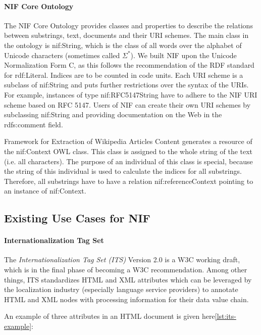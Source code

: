\documentclass[thesis=M,english,hidelinks]{FITthesis}[2019/12/23]
\begin{document}
\paragraph{NIF Core Ontology}



The NIF Core Ontology\cite{nif_core_ontology} provides classes and properties to describe the relations between substrings, text, documents and their URI schemes. The main class in the ontology is nif:String, which is the class of all words over the alphabet of Unicode characters (sometimes called $\Sigma^{*}$). We built NIF upon the Unicode Normalization Form C, as this follows the recommendation of the RDF standard for rdf:Literal. Indices are to be counted in code units. Each URI scheme is a subclass of nif:String and puts further restrictions over the syntax of the URIs. For example, instances of type nif:RFC5147String have to adhere to the NIF URI scheme based on RFC 5147. Users of NIF can create their own URI schemes by subclassing nif:String and providing documentation on the Web in the rdfs:comment field.

Framework for Extraction of Wikipedia Articles Content generates a resource of the nif:Context OWL class. This class is assigned to the whole string of the text (i.e. all characters). The purpose of an individual of this class is special, because the string of this individual is used to calculate the indices for all substrings. Therefore, all substrings have to have a relation nif:referenceContext pointing to an instance of nif:Context.

\subsection{Existing Use Cases for NIF}

\paragraph{Internationalization Tag Set}
The \textit{Internationalization Tag Set (ITS)} Version 2.0 is a W3C working draft, which is in the final phase of becoming a W3C recommendation. Among other things, ITS standardizes HTML and XML attributes which can be leveraged by the localization industry (especially language service providers) to annotate HTML and XML nodes with processing information for their data value chain.

An example of three attributes in an HTML document is given here\ref{lst:its-example}:
\end{document}
